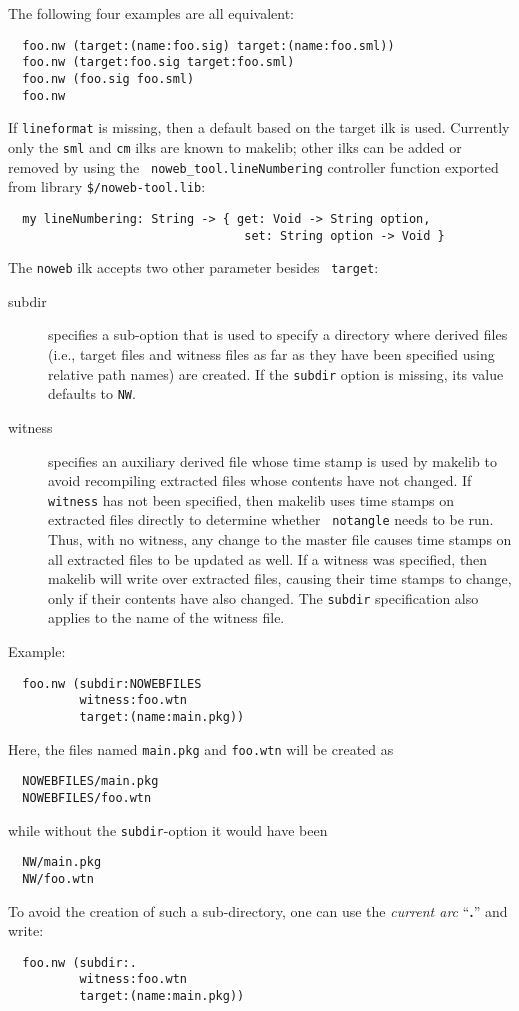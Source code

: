 The following four examples are all equivalent:

\begin{verbatim}
  foo.nw (target:(name:foo.sig) target:(name:foo.sml))
  foo.nw (target:foo.sig target:foo.sml)
  foo.nw (foo.sig foo.sml)
  foo.nw
\end{verbatim}

If {\tt lineformat} is missing, then a default based on the target
ilk is used.  Currently only the {\tt sml} and {\tt cm} ilks are
known to makelib; other ilks can be added or removed by using the {\tt
noweb_tool.lineNumbering} controller function exported from library
{\tt \$/noweb-tool.lib}:

\begin{verbatim}
  my lineNumbering: String -> { get: Void -> String option,
                                 set: String option -> Void }
\end{verbatim}

The {\tt noweb} ilk accepts two other parameter besides {\tt
target}:

\begin{description}
\item[subdir] specifies a sub-option that is used to specify a
directory where derived files (i.e., target files and witness files as
far as they have been specified using relative path names) are
created.  If the {\tt subdir} option is missing, its value defaults to
{\tt NW}.
\item[witness] specifies an auxiliary derived file whose time stamp is
used by makelib to avoid recompiling extracted files whose contents have
not changed.  If {\tt witness} has not been specified, then makelib uses
time stamps on extracted files directly to determine whether {\tt
notangle} needs to be run.  Thus, with no witness, any change to the
master file causes time stamps on all extracted files to be updated as
well.  If a witness was specified, then makelib will write over extracted
files, causing their time stamps to change, only if their contents
have also changed.  The {\tt subdir} specification also applies to the
name of the witness file.
\end{description}

Example:

\begin{verbatim}
  foo.nw (subdir:NOWEBFILES
          witness:foo.wtn
          target:(name:main.pkg))
\end{verbatim}

Here, the files named {\tt main.pkg} and {\tt foo.wtn} will be
created as
\begin{verbatim}
  NOWEBFILES/main.pkg
  NOWEBFILES/foo.wtn
\end{verbatim}
\noindent while without the {\tt subdir}-option it would have been
\begin{verbatim}
  NW/main.pkg
  NW/foo.wtn
\end{verbatim}
\noindent To avoid the creation of such a sub-directory, one can use
the {\em current arc} ``{\bf .}'' and write:
\begin{verbatim}
  foo.nw (subdir:.
          witness:foo.wtn
          target:(name:main.pkg))
\end{verbatim}

